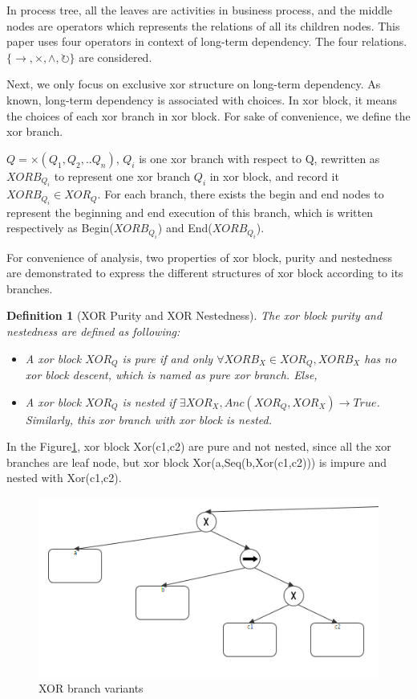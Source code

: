 \documentclass[]{article}
\newtheorem{mydef}{Definition}[section]
\begin{document}
In process tree, all the leaves are activities in business process, and the middle nodes are operators which represents the relations of all its children nodes\cite{vanderAalst:2016:PMD:2948762,leemans2013discovering}. This paper uses four operators in context of long-term dependency. The four relations.  $\{\rightarrow, \times, \land, \circlearrowright\}$ are considered. 

Next, we only focus on exclusive xor structure on long-term dependency. As known, long-term dependency is associated with choices. In xor block, it means the choices of each xor branch in xor block. For sake of convenience, we define the xor branch.

$Q= \times(Q_1 , Q_2 ,.. Q_n)$, $Q_i$ is one xor branch with respect to Q, rewritten as $XORB_{Q_i}$ to represent one xor branch $Q_i$ in xor block, and record it $XORB_{Q_i} \in XOR_{Q}$. For each branch, there exists the begin and end nodes to represent the beginning and end execution of this branch, which is written respectively as Begin($XORB_{Q_i}$) and End($XORB_{Q_i}$).

For convenience of analysis, two properties of xor block, purity and nestedness are demonstrated to express the different structures of xor block according to its branches.
\begin{mydef}[XOR Purity and XOR Nestedness] The xor block purity and nestedness are defined as following: \\
	\begin{itemize}
		\item A xor block $XOR_Q$ is pure if and only $\forall XORB_X \in XOR_Q, XORB_X $ has no xor block descent, which is named as pure xor branch. Else,
		\item A xor block $XOR_Q$ is nested if $ \exists XOR_X, Anc(XOR_Q, XOR_X) \rightarrow True  $. Similarly, this xor branch with xor block is nested.
	\end{itemize}
\end{mydef}
In the Figure\ref {fig:xor_nested_branch_variants}, xor block Xor(c1,c2) are pure and not nested, since all the xor branches are leaf node, but xor block Xor(a,Seq(b,Xor(c1,c2))) is impure and nested with Xor(c1,c2). 
\begin{figure}[h!]
	\includegraphics[width=\textwidth]{PT02_xor_nested_and_pure.png}
	\caption{XOR branch variants}
	\label{fig:xor_nested_branch_variants}
\end{figure}
\end{document}

